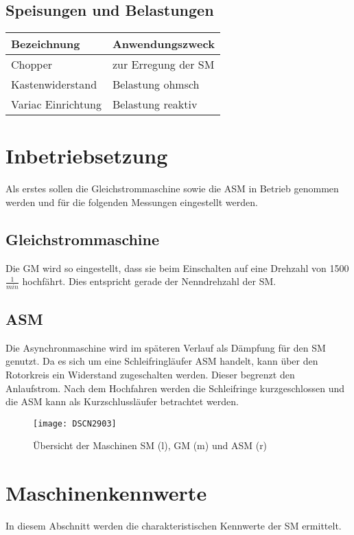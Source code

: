 \begin{flushleft}
\subsection{Speisungen und Belastungen}

\begin{tabular}{|L{0.3 \textwidth}|l|}
 \hline
  \textbf{Bezeichnung} & \textbf{Anwendungszweck}  \\
 \hline
 Chopper  & zur Erregung der SM  \\
\hline
Kastenwiderstand & Belastung ohmsch  \\
\hline
 Variac Einrichtung & Belastung reaktiv  \\
\hline

\end{tabular}



\newpage
\section{Inbetriebsetzung}
Als erstes sollen die Gleichstrommaschine sowie die ASM in Betrieb genommen werden und für die folgenden Messungen eingestellt werden.
\subsection{Gleichstrommaschine}
Die GM wird so eingestellt, dass sie beim Einschalten auf eine Drehzahl von 1500 $\frac{1}{min}$ hochfährt. Dies entspricht gerade der Nenndrehzahl der SM.

\subsection{ASM}
Die Asynchronmaschine wird im späteren Verlauf als Dämpfung für den SM genutzt. 
Da es sich um eine Schleifringläufer ASM handelt, kann über den Rotorkreis ein Widerstand zugeschalten werden. Dieser begrenzt den Anlaufstrom. Nach dem Hochfahren werden die Schleifringe kurzgeschlossen und die ASM kann als Kurzschlussläufer betrachtet werden.
\begin{figure}[H]
    \centering
        \texttt{[image: DSCN2903]}
    \caption{Übersicht der Maschinen SM (l), GM (m) und ASM (r)}
    \label{fig:Maschinenuebersicht}
\end{figure}


\newpage



\section{Maschinenkennwerte}\label{maschinenkennwerte}
In diesem Abschnitt werden die charakteristischen Kennwerte der SM ermittelt.


\end{flushleft}
